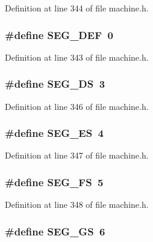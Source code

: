 Definition at line 344 of file machine.h.
\subsubsection[{SEG\_\-DEF}]{\setlength{\rightskip}{0pt plus 5cm}\#define SEG\_\-DEF~0}\label{machine_8h_8e96f395ed520f27066d0a0542166da8}




Definition at line 343 of file machine.h.
\subsubsection[{SEG\_\-DS}]{\setlength{\rightskip}{0pt plus 5cm}\#define SEG\_\-DS~3}\label{machine_8h_5d13293e61247df517ed00f93d92f895}




Definition at line 346 of file machine.h.
\subsubsection[{SEG\_\-ES}]{\setlength{\rightskip}{0pt plus 5cm}\#define SEG\_\-ES~4}\label{machine_8h_25945dd2b1dfbf16aa3ad58989d13dde}




Definition at line 347 of file machine.h.
\subsubsection[{SEG\_\-FS}]{\setlength{\rightskip}{0pt plus 5cm}\#define SEG\_\-FS~5}\label{machine_8h_71095c6827ec6c92c1de1834b1634467}




Definition at line 348 of file machine.h.
\subsubsection[{SEG\_\-GS}]{\setlength{\rightskip}{0pt plus 5cm}\#define SEG\_\-GS~6}\label{machine_8h_6feb6d46f4ed4e79f7e261b0b9ebbd07}




